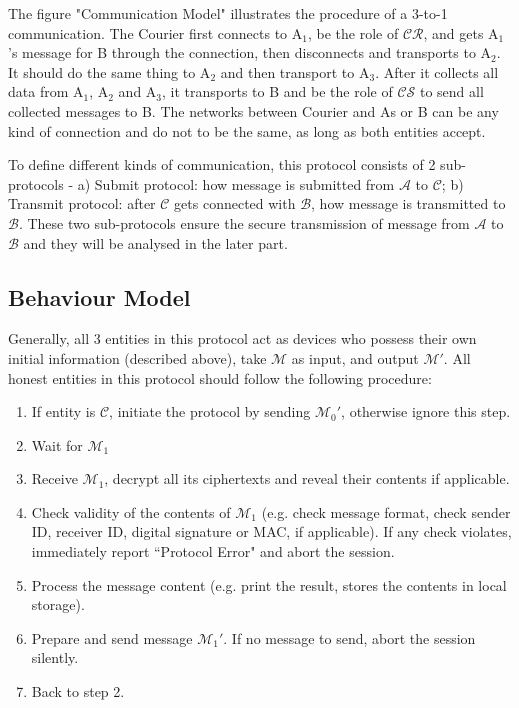 The figure "Communication Model" illustrates the procedure of a 3-to-1 communication. The Courier first connects to A$_1$, be the role of $\mathcal{CR}$, and gets A$_1$'s message for B through the connection, then disconnects and transports to A$_2$. It should do the same thing to A$_2$ and then transport to A$_3$. After it collects all data from A$_1$, A$_2$ and A$_3$, it transports to B and be the role of $\mathcal{CS}$ to send all collected messages to B. The networks between Courier and As or B can be any kind of connection and do not to be the same, as long as both entities accept. 

To define different kinds of communication, this protocol consists of 2 sub-protocols - a) Submit protocol: how message is submitted from $\mathcal{A}$ to $\mathcal{C}$; b) Transmit protocol: after $\mathcal{C}$ gets connected with $\mathcal{B}$, how message is transmitted to $\mathcal{B}$. These two sub-protocols ensure the secure transmission of message from $\mathcal{A}$ to $\mathcal{B}$ and they will be analysed in the later part.

\subsection{Behaviour Model}
Generally, all 3 entities in this protocol act as devices who possess their own initial information (described above), take $\mathcal{M}$ as input, and output $\mathcal{M'}$. All honest entities in this protocol should follow the following procedure:
\begin{enumerate}
\item If entity is $\mathcal{C}$, initiate the protocol by sending ${\mathcal{M}_0}'$, otherwise ignore this step.
\item Wait for $\mathcal{M}_1$
\item Receive $\mathcal{M}_1$, decrypt all its ciphertexts and reveal their contents if applicable.
\item Check validity of the contents of $\mathcal{M}_1$ (e.g. check message format, check sender ID, receiver ID, digital signature or MAC, if applicable). If any check violates, immediately report ``Protocol Error" and abort the session.
\item Process the message content (e.g. print the result, stores the contents in local storage).
\item Prepare and send message ${\mathcal{M}_1}'$. If no message to send, abort the session silently.
\item Back to step 2.
\end{enumerate}

